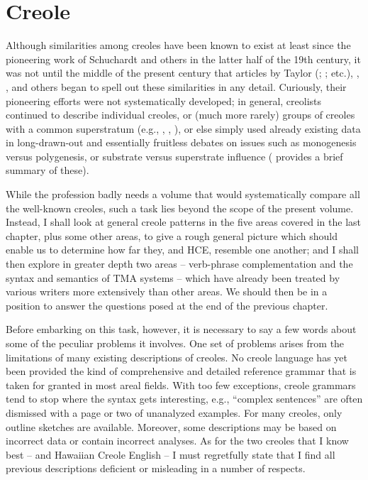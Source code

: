 \chapter{Creole} \label{ch:2}

Although similarities among creoles have been known to exist at least since the pioneering work of Schuchardt and others in the latter half of the 19th century, it was not until the middle of the present century that articles by Taylor (\citeyear{Taylor1960}; \citeyear{Taylor1963}; etc.), \citet{Thompson1961}, \citet{Whinnom1956, Whinnom1965}, and others began to spell out these similarities in any detail. Curiously, their pioneering efforts were not systematically developed; in general, creolists continued to describe individual creoles, or (much more rarely) groups of creoles with a common superstratum (e.g., \citealt{Goodman1964}, \citealt{Hancock1970}, \citealt{Alleyne1980}), or else simply used already existing data in long-drawn-out and essentially fruitless debates on issues such as monogenesis versus poly\-genesis, or substrate versus superstrate influence (\citealt{Bickerton1976} provides a brief summary of these).

While the profession badly needs a volume that would systematically compare all the well-known creoles, such a task lies beyond the scope of the present volume. Instead, I shall look at general creole patterns in the five areas covered in the last chapter, plus some other areas, to give a rough general picture which should enable us to deter\-mine how far they, and HCE, resemble one another; and I shall then
explore in greater depth two areas -- verb-phrase complementation and the syntax and semantics of TMA systems -- which have already been treated by various writers more extensively than other areas. We should then be in a position to answer the questions posed at the end of the previous chapter. 

Before embarking on this task, however, it is necessary to say a few words about some of the peculiar problems it involves. One set of problems arises from the limitations of many existing descriptions of creoles. No creole language has yet been provided the kind of com\-prehensive and detailed reference grammar that is taken for granted in most areal fields. With too few exceptions, creole grammars tend to stop where the syntax gets interesting, e.g., ``complex sentences'' are often dismissed with a page or two of unanalyzed examples. For many creoles, only outline sketches are available. Moreover, some descriptions may be based on incorrect data or contain incorrect analyses. As for the two creoles that I know best --  and Hawaiian Creole English -- I must regretfully state that I find all previous descriptions deficient or misleading in a number of respects.

